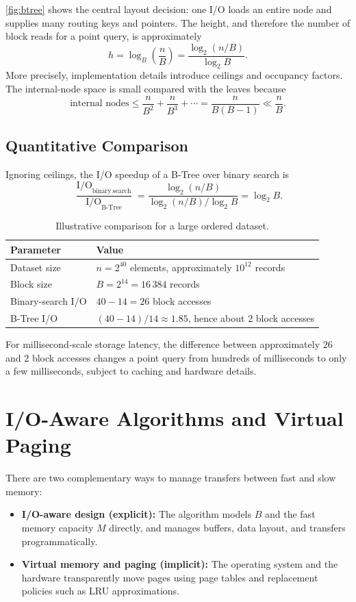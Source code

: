 \autoref{fig:btree} shows the central layout decision: one I/O loads an entire
node and supplies many routing keys and pointers. The height, and therefore
the number of block reads for a point query, is approximately
\[
  h = \log_B\!\left(\frac{n}{B}\right)
    = \frac{\log_2(n/B)}{\log_2 B}.
\]
More precisely, implementation details introduce ceilings and occupancy
factors. The internal-node space is small compared with the leaves because
\[
  \text{internal nodes}
  \leq \frac{n}{B^2}+\frac{n}{B^3}+\cdots
  = \frac{n}{B(B-1)}
  \ll \frac{n}{B}.
\]

\subsection{Quantitative Comparison}
\label{subsec:btree-comparison}

Ignoring ceilings, the I/O speedup of a B-Tree over binary search is
\[
  \frac{\operatorname{I/O}_{\mathrm{binary\ search}}}
       {\operatorname{I/O}_{\mathrm{B\text{-}Tree}}}
  = \frac{\log_2(n/B)}{\log_2(n/B)/\log_2 B}
  = \log_2 B.
\]

\begin{table}[H]
  \centering
  \caption{Illustrative comparison for a large ordered dataset.}
  \label{tab:btree-example}
  \begin{tabularx}{\textwidth}{@{}lX@{}}
    \toprule
    Parameter & Value \\
    \midrule
    Dataset size & $n=2^{40}$ elements, approximately $10^{12}$ records \\
    Block size & $B=2^{14}=16\,384$ records \\
    Binary-search I/O & $40-14=26$ block accesses \\
    B-Tree I/O & $(40-14)/14\approx1.85$, hence about $2$ block accesses \\
    \bottomrule
  \end{tabularx}
\end{table}

For millisecond-scale storage latency, the difference between approximately
$26$ and $2$ block accesses changes a point query from hundreds of milliseconds
to only a few milliseconds, subject to caching and hardware details.

\section{I/O-Aware Algorithms and Virtual Paging}
\label{sec:paging}

There are two complementary ways to manage transfers between fast and slow
memory:
\begin{itemize}
  \item \textbf{I/O-aware design (explicit):} The algorithm models $B$ and the fast
    memory capacity $M$ directly, and manages buffers, data layout, and
    transfers programmatically.
  \item \textbf{Virtual memory and paging (implicit):} The operating system and the
    hardware transparently move pages using page tables and replacement
    policies such as LRU approximations.
\end{itemize}

